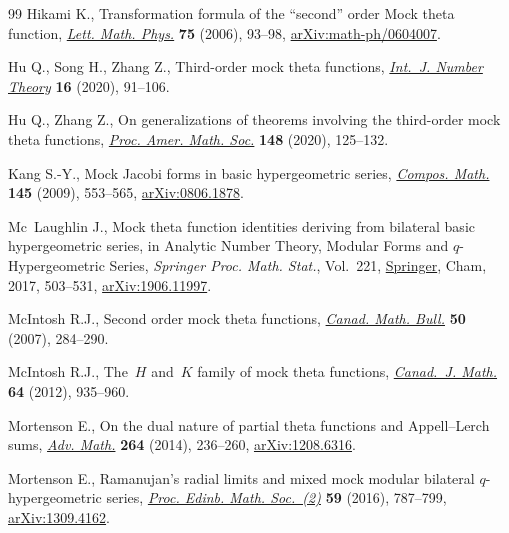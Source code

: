\documentclass[10pt,a4paper]{amsart}
\numberwithin{equation}{section}
\begin{document}
\begin{thebibliography}{99}
Hikami K., Transformation formula of the ``second'' order {M}ock theta
  function, \href{https://doi.org/10.1007/s11005-005-0039-1}{\textit{Lett.
  Math. Phys.}} \textbf{75} (2006), 93--98,
  \href{http://arxiv.org/abs/math-ph/0604007}{arXiv:math-ph/0604007}.

Hu Q., Song H., Zhang Z., Third-order mock theta functions,
  \href{https://doi.org/10.1142/S1793042120500050}{\textit{Int.~J. Number
  Theory}} \textbf{16} (2020), 91--106.

Hu Q., Zhang Z., On generalizations of theorems involving the third-order mock
  theta functions, \href{https://doi.org/10.1090/proc/14691}{\textit{Proc.
  Amer. Math. Soc.}} \textbf{148} (2020), 125--132.

Kang S.-Y., Mock {J}acobi forms in basic hypergeometric series,
  \href{https://doi.org/10.1112/S0010437X09004060}{\textit{Compos. Math.}}
  \textbf{145} (2009), 553--565,
  \href{http://arxiv.org/abs/0806.1878}{arXiv:0806.1878}.

Mc~Laughlin J., Mock theta function identities deriving from bilateral basic
  hypergeometric series, in Analytic {N}umber {T}heory, {M}odular {F}orms and
  {$q$}-{H}ypergeometric {S}eries, \textit{Springer Proc. Math. Stat.}, Vol.~221, \href{https://doi.org/10.1007/978-3-319-68376-8_29}{Springer}, Cham,
  2017, 503--531, \href{http://arxiv.org/abs/1906.11997}{arXiv:1906.11997}.

McIntosh R.J., Second order mock theta functions,
  \href{https://doi.org/10.4153/CMB-2007-028-9}{\textit{Canad. Math. Bull.}}
  \textbf{50} (2007), 284--290.

McIntosh R.J., The~{$H$} and~{$K$} family of mock theta functions,
  \href{https://doi.org/10.4153/CJM-2011-066-0}{\textit{Canad.~J. Math.}}
  \textbf{64} (2012), 935--960.

Mortenson E., On the dual nature of partial theta functions and
  {A}ppell--{L}erch sums,
  \href{https://doi.org/10.1016/j.aim.2014.07.018}{\textit{Adv. Math.}}
  \textbf{264} (2014), 236--260,
  \href{http://arxiv.org/abs/1208.6316}{arXiv:1208.6316}.

Mortenson E., Ramanujan's radial limits and mixed mock modular bilateral
  {$q$}-hypergeometric series,
  \href{https://doi.org/10.1017/S0013091515000425}{\textit{Proc. Edinb. Math.
  Soc.~(2)}} \textbf{59} (2016), 787--799,
  \href{http://arxiv.org/abs/1309.4162}{arXiv:1309.4162}.


\end{thebibliography}
\end{document}
